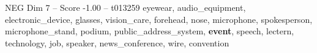 \begin{textsample}{NEG Dim 7 – Score -1.00 – t013259}  \label{ex:f7_neg_024}
eyewear, audio\_equipment, electronic\_device, glasses, vision\_care, forehead, nose, microphone, spokesperson, microphone\_stand, podium, public\_address\_system, \textbf{event}, speech, lectern, technology, job, speaker, news\_conference, wire, convention

\end{textsample}

